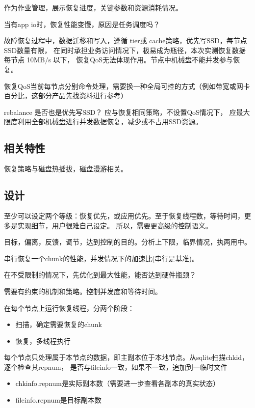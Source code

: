 作为作业管理，展示恢复进度，关键参数和资源消耗情况。

当有app io时，恢复性能变慢，原因是任务调度吗？

故障恢复过程中，数据迁移和写入，遵循 tier或 cache策略，优先写SSD，每节点SSD数量有限，
在同时承担业务访问情况下，极易成为瓶径，本次实测恢复数据每节点 10MB/s 以下，
恢复QoS无法体现作用。节点中机械盘不能并发参与恢复。

恢复QoS当前每节点分别命令处理，需要换一种全局可控的方式（例如带宽或网卡百分比，这部分产品先找资料进行参考）

rebalance 是否也是优先写SSD？ 应与恢复相同策略，不设置QoS情况下，
应最大限度利用全部机械盘进行并发数据恢复，减少或不占用SSD资源。

\subsection{相关特性}

恢复策略与磁盘热插拔，磁盘漫游相关。

\subsection{设计}

至少可以设定两个等级：恢复优先，或应用优先。至于恢复线程数，等待时间，更多是实现细节，用户很难自己设定。
所以，需要更高级的控制语义。

目标，偏离，反馈，调节，达到控制的目的。分析上下限，临界情况，执两用中。

串行恢复一个chunk的性能，并发情况下的加速比(串行是基准)。

在不受限制的情况下，先优化到最大性能，能否达到硬件瓶颈？

需要有约束的机制和策略。控制并发度和等待时间。

在每个节点上运行恢复线程，分两个阶段：
\begin{itemize}
\item 扫描，确定需要恢复的chunk
\item 恢复，多线程执行
\end{itemize}

每个节点只处理属于本节点的数据，即主副本位于本地节点。从sqlite扫描chkid，逐个检查其repnum，
是否与fileinfo一致，如果不一致，追加到一临时文件
\begin{itemize}
\item chkinfo.repnum是实际副本数（需要进一步查看各副本的真实状态）
\item fileinfo.repnum是目标副本数
\end{itemize}

